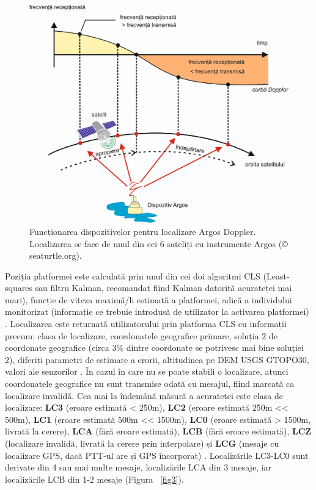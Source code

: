 \documentclass[11pt,onehalfspacing]{elife}
\begin{document}
\begin{figure}[ht]
\includegraphics[width=\textwidth]{Fig2.jpg}
\caption{Funcționarea dispozitivelor pentru localizare Argos Doppler. Localizarea se face de unul din cei 6 sateliți cu instrumente Argos (© seaturtle.org).} \label{fig2}
\end{figure}
Poziția platformei este calculată prin unul din cei doi algoritmi CLS (Least-squares sau filtru Kalman, recomandat fiind Kalman datorită acurateței mai mari), funcție de viteza maximă/h estimată a platformei, adică a individului monitorizat (informație ce trebuie introdusă de utilizator la activarea platformei) \citep{Lopez2015,Lowther2015}. Localizarea este returnată utilizatorului prin platforma CLS cu informații precum: clasa de localizare, coordonatele geografice primare, soluția 2 de coordonate geografice (circa 3\% dintre coordonate se potrivesc mai bine soluției 2), diferiți parametri de estimare a erorii, altitudinea pe DEM USGS GTOPO30, valori ale senzorilor \citep{Douglas2012}. În cazul în care nu se poate stabili o localizare, atunci coordonatele geografice nu sunt transmise odată cu mesajul, fiind marcată ca localizare invalidă. Cea mai la îndemână măsură a acurateței este clasa de localizare: \textbf{LC3} (eroare estimată < 250m), \textbf{LC2} (eroare estimată 250m << 500m), \textbf{LC1} (eroare estimată 500m << 1500m), \textbf{LC0} (eroare estimată > 1500m, livrată la cerere), \textbf{LCA} (fără eroare estimată), \textbf{LCB} (fără eroare estimată), \textbf{LCZ} (localizare invalidă, livrată la cerere prin interpolare) și \textbf{LCG} (mesaje cu localizare GPS, dacă PTT-ul are și GPS încorporat) \citep{CLS2016}. Localizările LC3-LC0 sunt derivate din 4 sau mai multe mesaje, localizările LCA din 3 mesaje, iar localizările LCB din 1-2 mesaje \citep{CLS2016} (Figura ~\ref{fig3}).
\end{document}
